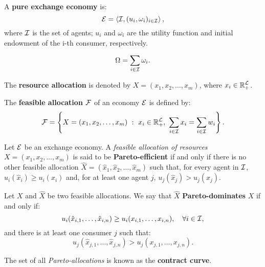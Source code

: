 \documentclass[8pt,a4paper]{extarticle}
\begin{document}
\begin{multicols}{3}
  \begin{boxdef}
    A \textbf{pure exchange economy} is: $$\mathcal{E} = \left\langle \mathcal{I}, (u_i, \omega_i)_{i \in \mathcal{I}} \right\rangle,$$  where $\mathcal{I}$ is the set of agents; $u_i$ and $\omega_i$ are the utility function and initial endowment of the i-th consumer, respectively.
  \end{boxdef}

  \begin{boxdef}
    \[
      \Omega = \sum_{i \in \mathcal{I}} \omega_i
      .\]
  \end{boxdef}

  \begin{boxdef}
    The \textbf{resource allocation} is denoted by $X = (x_1, x_2, \ldots, x_m)$, where $\displaystyle x_i \in \mathbb{R}_{+}^{\mathcal{L}}$.
  \end{boxdef}

  \begin{boxdef}
    The \textbf{feasible allocation} $\mathcal{F}$ of an economy $\mathcal{E}$ is defined by:
    \[
      \mathcal{F} = \left\{ X = (x_1, x_2, \ldots, x_m)\ :\ x_i \in \mathbb{R}_{+}^{\mathcal{L}},\ \sum_{i \in \mathcal{I}} x_i = \sum_{i \in \mathcal{I}} w_i \right\}
      .\]
  \end{boxdef}

  \begin{boxdef}
    Let $\mathcal{E}$ be an exchange economy. A \emph{feasible allocation of resources} $X = (x_1, x_2, \ldots, x_m)$ is said to be \textbf{Pareto-efficient} if and only if there is no other feasible allocation $\hat{X} = (\hat{x}_1, \hat{x}_2, \ldots, \hat{x}_m)$ such that, for every agent in $\mathcal{I}$, $u_i(\hat{x}_i) \ge u_i(x_i)$ and, for at least one agent $j$, $u_{j} (\hat{x}_{j}) > u_{j} (x_{j})$.
  \end{boxdef}

  \begin{boxdef}
    Let $X$ and $\hat{X}$ be two feasible allocations. We say that $\hat{X}$ \textbf{Pareto-dominates} $X$ if and only if:
    \[
      u_i (\hat{x}_{i, 1}, \ldots, \hat{x}_{i, n}) \ge u_i (x_{i, 1}, \ldots, x_{i, n}), \quad \forall i \in \mathcal{I}
      ,\]
    and there is at least one consumer $j$ such that:
    \[
      u_j (\hat{x}_{j, 1}, \ldots, \hat{x}_{j, n}) > u_j (x_{j, 1}, \ldots, x_{j, n})
      .\]
  \end{boxdef}

  \begin{boxdef}
    The set of all \emph{Pareto-allocations} is known as the \textbf{contract curve}.
  \end{boxdef}


\end{multicols}
\end{document}
